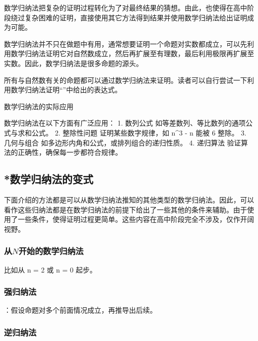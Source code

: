 数学归纳法把复杂的证明过程转化为了对最终结果的猜想。由此，也使得在高中阶段绕过复杂困难的证明，直接使用其它方法得到结果并使用数学归纳法给出证明成为可能。

数学归纳法并不只在做题中有用，通常想要证明一个命题对实数都成立，可以先利用数学归纳法证明它对自然数成立，然后再扩展至有理数，最后利用极限再扩展至实数。因此，数学归纳法是很多命题的源头。

所有与自然数有关的命题都可以通过数学归纳法来证明。读者可以自行尝试一下利用数学归纳法证明“”中给出的表达式。

数学归纳法的实际应用

数学归纳法在以下方面有广泛应用：
	1.	数列公式
如等差数列、等比数列的通项公式与求和公式。
	2.	整除性问题
证明某些数字规律，如 n^3 - n 能被 6 整除。
	3.	几何与组合
如多边形内角和公式，或排列组合的递归性质。
	4.	递归算法
验证算法的正确性，确保每一步都符合规律。



\subsection{*数学归纳法的变式}

下面介绍的方法都是可以从数学归纳法推知的其他类型的数学归纳法。因此，可以看作这些归纳法都是在数学归纳法的前提下给出了一些其他的条件来辅助。由于使用了一些条件，使得证明过程更简单。这些内容在高中阶段完全不涉及，仅作开阔视野。

\subsubsection{从$N$开始的数学归纳法}
比如从 n = 2 或 n = 0 起步。

\subsubsection{强归纳法}

：假设命题对多个前面情况成立，再推导出后续。

\subsubsection{逆归纳法}